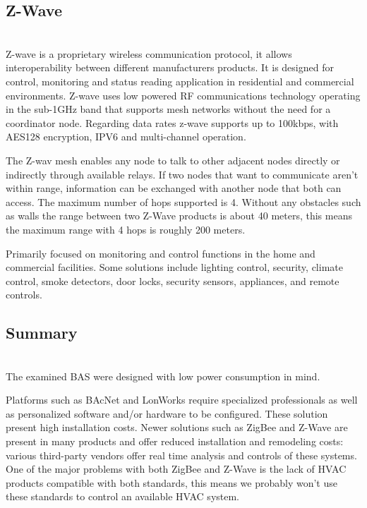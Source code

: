 %


\subsection{Z-Wave}\label{zwave_sub}\mbox{}\\


Z-wave \cite{zwave}\cite{zigbeeAndZWave} is a proprietary wireless communication protocol, it allows interoperability between different manufacturers products. It is designed for control, monitoring and status reading application in residential and commercial environments.
Z-wave uses low powered RF communications technology operating in the sub-1GHz band that supports mesh networks without the need for a coordinator node.
Regarding data rates z-wave supports up to 100kbps, with AES128 encryption, IPV6 and multi-channel operation.

The Z-wav mesh enables any node to talk to other adjacent nodes directly or indirectly through available relays. If two nodes that want to communicate aren't within range, information can be exchanged with another node that both can access. The maximum number of hops supported is 4. Without any obstacles such as walls the range between two Z-Wave products is about 40 meters, this means the maximum range with 4 hops is roughly 200 meters.  


Primarily focused on monitoring and control functions in the home and  commercial facilities. Some solutions include lighting control, security, climate control, smoke detectors, door locks, security sensors, appliances, and remote controls.

\subsection{Summary}\mbox{}\\

The examined BAS were designed with low power consumption in mind. 

Platforms such as BAcNet and LonWorks require specialized professionals as well as personalized software and/or hardware to be configured. These solution present high installation costs. Newer solutions such as ZigBee and Z-Wave are present in many products and offer reduced installation and remodeling costs: various third-party vendors offer real time analysis and controls of these systems. One of the major problems with both ZigBee and Z-Wave is the lack of \ac{HVAC} products compatible with both standards, this means we probably won't use these standards to control an available \ac{HVAC} system.




